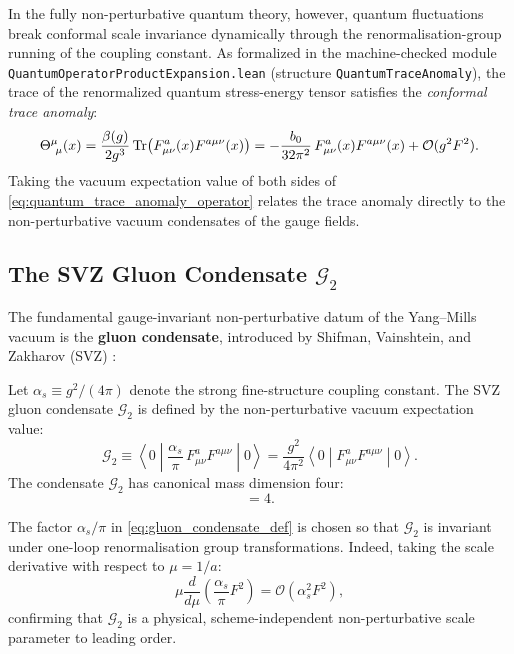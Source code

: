 In the fully non-perturbative quantum theory, however, quantum fluctuations break conformal scale invariance dynamically through the renormalisation-group running of the coupling constant. As formalized in the machine-checked module \texttt{QuantumOperatorProductExpansion.lean} (structure \texttt{QuantumTraceAnomaly}), the trace of the renormalized quantum stress-energy tensor satisfies the \emph{conformal trace anomaly}:
\begin{equation}
\label{eq:quantum_trace_anomaly_operator}
\Theta^\mu_{\ \mu}(x) = \frac{\beta(g)}{2 g^3} \, \mathrm{Tr}\bigl( F_{\mu\nu}^a(x) F^{a\mu\nu}(x) \bigr) = -\frac{b_0}{32\pi^2} \, F_{\mu\nu}^a(x) F^{a\mu\nu}(x) + \mathcal{O}(g^2 F^2).
\end{equation}
Taking the vacuum expectation value of both sides of \eqref{eq:quantum_trace_anomaly_operator} relates the trace anomaly directly to the non-perturbative vacuum condensates of the gauge fields.

\subsection{The SVZ Gluon Condensate $\mathcal{G}_2$}
\label{subsec:svz_condensate_definition}

The fundamental gauge-invariant non-perturbative datum of the Yang--Mills vacuum is the \textbf{gluon condensate}, introduced by Shifman, Vainshtein, and Zakharov (SVZ) \cite{ShifmanVainshteinZakharov1979}:

\begin{definition}
\label{def:gluon_condensate}
Let $\alpha_s \equiv g^2 / (4\pi)$ denote the strong fine-structure coupling constant. The SVZ gluon condensate $\mathcal{G}_2$ is defined by the non-perturbative vacuum expectation value:
\begin{equation}
\label{eq:gluon_condensate_def}
\mathcal{G}_2 \equiv \left\langle 0 \middle| \frac{\alpha_s}{\pi} \, F_{\mu\nu}^a F^{a\mu\nu} \middle| 0 \right\rangle = \frac{g^2}{4\pi^2} \left\langle 0 \middle| F_{\mu\nu}^a F^{a\mu\nu} \middle| 0 \right\rangle.
\end{equation}
The condensate $\mathcal{G}_2$ has canonical mass dimension four:
\begin{equation}
[\mathcal{G}_2] = 4.
\end{equation}
\end{definition}

The factor $\alpha_s / \pi$ in \eqref{eq:gluon_condensate_def} is chosen so that $\mathcal{G}_2$ is invariant under one-loop renormalisation group transformations. Indeed, taking the scale derivative with respect to $\mu = 1/a$:
\begin{equation}
\mu \frac{d}{d\mu} \left( \frac{\alpha_s}{\pi} F^2 \right) = \mathcal{O}(\alpha_s^2 F^2),
\end{equation}
confirming that $\mathcal{G}_2$ is a physical, scheme-independent non-perturbative scale parameter to leading order.

